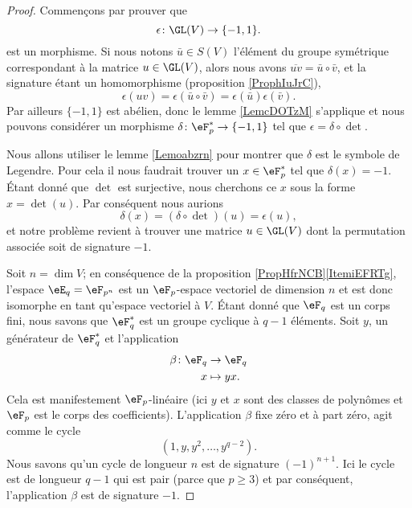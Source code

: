 \begin{proof}
    Commençons par prouver que
    \begin{equation}
        \epsilon\colon \GL(V)\to \{ -1,1 \}.
    \end{equation}
    est un morphisme. Si nous notons \( \bar u\in S(V)\) l'élément du groupe symétrique correspondant à la matrice \( u\in \GL(V)\), alors nous avons \( \overline{ uv }=\bar u\circ\bar v\), et la signature étant un homomorphisme (proposition \ref{ProphIuJrC}), 
    \begin{equation}
        \epsilon(uv)=\epsilon(\bar u\circ\bar v)=\epsilon(\bar u)\epsilon(\bar v).
    \end{equation}
    Par ailleurs \( \{ -1,1 \}\) est abélien, donc le lemme \ref{LemcDOTzM} s'applique et nous pouvons considérer un morphisme \( \delta\colon \eF_p^*\to \{ -1,1 \}\) tel que \( \epsilon=\delta\circ\det\).

    Nous allons utiliser le lemme \ref{Lemoabzrn} pour montrer que \( \delta\) est le symbole de Legendre. Pour cela il nous faudrait trouver un \( x\in \eF_p^*\) tel que \( \delta(x)=-1\). Étant donné que \( \det\) est surjective, nous cherchons ce \( x\) sous la forme \( x=\det(u)\). Par conséquent nous aurions
    \begin{equation}
        \delta(x)=(\delta\circ\det)(u)=\epsilon(u),
    \end{equation}
    et notre problème revient à trouver une matrice \( u\in\GL(V)\) dont la permutation associée soit de signature \( -1\).

    Soit \( n=\dim V\); en conséquence de la proposition \ref{PropHfrNCB}\ref{ItemiEFRTg}, l'espace \( \eE_q=\eF_{p^n}\) est un \( \eF_p\)-espace vectoriel de dimension \( n\) et est donc isomorphe en tant qu'espace vectoriel à \( V\). Étant donné que \( \eF_q\) est un corps fini, nous savons que \( \eF_q^*\) est un groupe cyclique à \( q-1\) éléments. Soit \( y\), un générateur de \( \eF_q^*\) et l'application
    \begin{equation}
        \begin{aligned}
            \beta\colon \eF_q&\to \eF_q \\
            x&\mapsto yx. 
        \end{aligned}
    \end{equation}
    Cela est manifestement \( \eF_p\)-linéaire (ici \( y\) et \( x\) sont des classes de polynômes et \( \eF_p\) est le corps des coefficients). L'application \( \beta\) fixe zéro et à part zéro, agit comme le cycle
    \begin{equation}
        (1,y,y^2,\ldots, y^{q-2}).
    \end{equation}
    Nous savons qu'un cycle de longueur \( n\) est de signature \( (-1)^{n+1}\). Ici le cycle est de longueur \( q-1\) qui est pair (parce que \( p\geq 3\)) et par conséquent, l'application \( \beta\) est de signature \( -1\).
\end{proof}

